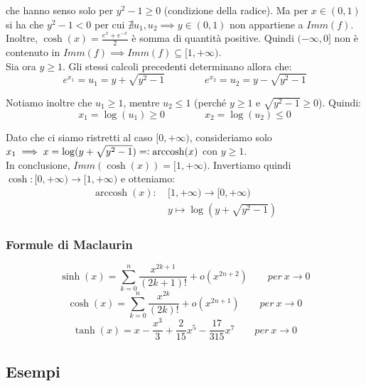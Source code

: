 \documentclass{article}
\DeclareMathOperator{\arccosh}{arccosh}
\begin{document}
\noindent che hanno senso solo per $y^2 - 1 \geq 0$ (condizione della radice). Ma per $x \in (0, 1)$ si ha che $y^2 - 1 < 0$ per cui $\nexists u_1, u_2 \implies y \in (0, 1)$ non appartiene a $Imm(f)$. Inoltre, $\cosh(x) = \frac{e^x + e^{-x}}{2}$ è somma di quantità positive. Quindi $(-\infty, 0]$ non è contenuto in $Imm(f) \implies Imm(f) \subseteq [1, +\infty)$. \\
Sia ora $y \geq 1$. Gli stessi calcoli precedenti determinano allora che:
\begin{equation*}
    e^{x_1} = u_1 = y + \sqrt{y^2 - 1} \qquad \qquad e^{x_2} = u_2 = y - \sqrt{y^2 - 1}
\end{equation*}

\noindent Notiamo inoltre che $u_1 \geq 1$, mentre $u_2 \leq 1$ (perché $y \geq 1$ e $\sqrt{y^2 - 1} \geq 0$). Quindi:
\begin{equation*}
    x_1 = \log(u_1) \geq 0 \qquad \qquad x_2 = \log(u_2) \leq 0
\end{equation*}

\noindent Dato che ci siamo ristretti al caso $[0, +\infty)$, consideriamo solo $x_1 \implies x = \log(y + \sqrt{y^2 - 1}) =\vcentcolon \arccosh(x)$ con $y \geq 1$.\\
In conclusione, $Imm(\cosh(x)) = [1, +\infty)$. Invertiamo quindi $\cosh: [0, +\infty) \xrightarrow{} [1, +\infty)$ e otteniamo:
\begin{align*}
    \arccosh(x): \ & [1, +\infty) \xrightarrow{} [0, +\infty) \\
    & y \longmapsto  \log(y + \sqrt{y^2 - 1})
\end{align*}

\subsubsection{Formule di Maclaurin}
\begin{equation*}
    \sinh(x) = \sum_{k = 0}^n \frac{x^{2k + 1}}{(2k + 1)!} + o(x^{2n + 2}) \qquad per \ x \to 0
\end{equation*}
\begin{equation*}
    \cosh(x) = \sum_{k = 0}^n \frac{x^{2k}}{(2k)!} + o(x^{2n + 1}) \qquad per \ x \to 0
\end{equation*}
\begin{equation*}
    \tanh(x) = x - \frac{x^3}{3} + \frac{2}{15} x^5 - \frac{17}{315} x^7 \qquad per \ x \to 0
\end{equation*}

\subsection{Esempi}
\end{document}
